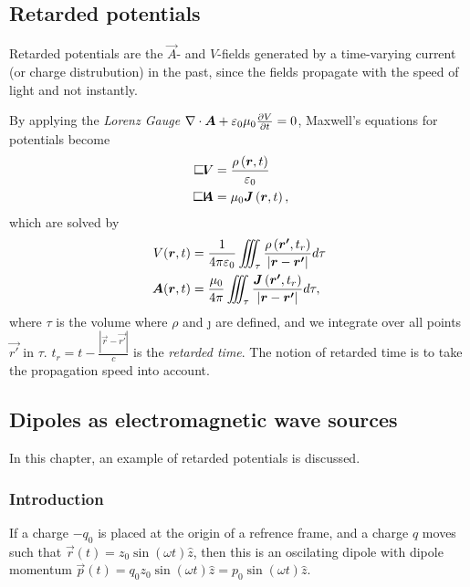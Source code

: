 \subsection{Retarded potentials}
    Retarded potentials are the $\vec{A}$- and $V$-fields generated by a time-varying current (or charge distrubution) in the past, 
    since the fields propagate with the speed of light and not instantly. 
    
    By applying the \textit{Lorenz Gauge} $\nabla\cdot\bm{A} + \varepsilon_0\mu_0\frac{\partial V}{\partial t} = 0$, 
    Maxwell's equations for potentials become
    \begin{align}
        \dalambert V &= \frac{\rho\left(\vec{r}, t\right)}{\e} \\
        \dalambert \vec{A} &= \mu_0 \j\left(\vec{r}, t\right),
    \end{align}
    which are solved by 
    \begin{align} 
        \label{retarded potentials 1}
        V(\bm{r}, t) &= \frac{1}{4\pi\varepsilon_0} \iiint_\tau \frac{\rho\left(\bm{r'}, t_r\right)}{|\bm{r} - \bm{r'}|}d\tau \\
        \bm{A}(\bm{r}, t) &= \frac{\mu_0}{4\pi} \iiint_\tau \frac{\bm{J}\left(\bm{r'}, t_r\right)}{|\bm{r} - \bm{r'}|}d\tau,
        \label{retarded potentials 2}
    \end{align}
    where $\tau$ is the volume where $\rho$ and \j{} are defined, 
    and we integrate over all points $\vec{r'}$ in $\tau$.
    $t_r = t - \frac{|\vec{r} - \vec{r'}|}{c}$ is the \textit{retarded time}. 
    The notion of retarded time is to take the propagation speed into account.

\subsection{Dipoles as electromagnetic wave sources}
    In this chapter, an example of retarded potentials is discussed. 

    \subsubsection*{Introduction}
        If a charge $-q_0$ is placed at the origin of a refrence frame, 
        and a charge $q$ moves such that $\vec{r}(t) = z_0 \sin\left(\omega t\right) \hat{z}$, 
        then this is an oscilating dipole with dipole momentum 
        $\vec{p}\left(t\right) = q_0 z_0 \sin\left(\omega t\right)\hat{z} = p_0 \sin\left(\omega t\right)\hat{z}$.

